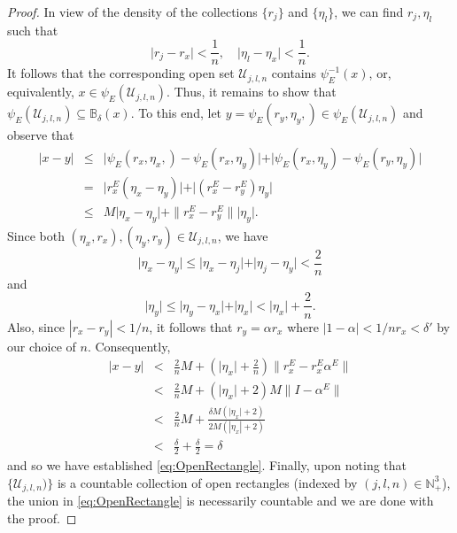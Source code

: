 \documentclass[11pt]{article}
\theoremstyle{remark}
\begin{document}
\begin{proof}
In view of the density of the collections $\{r_j\}$ and $\{\eta_l\}$, we can find $r_j, \eta_l$ such that
\begin{equation*}
    \vert r_j - r_x \vert < \frac{1}{n},\quad \vert \eta_l - \eta_x \vert < \frac{1}{n}.
\end{equation*}
It follows that the corresponding open set $\mathcal{U}_{j,l,n}$ contains $\psi_E^{-1}(x)$, or, equivalently, $x\in \psi_E(\mathcal{U}_{j,l,n})$. Thus, it remains to show that $\psi_E(\mathcal{U}_{j,l,n}) \subseteq \mathbb{B}_\delta(x)$. To this end, let $y=\psi_E(r_y,\eta_y,)\in\psi_E(\mathcal{U}_{j,l,n})$ and observe that
\begin{eqnarray*}
| x - y | &\leq& \vert \psi_E(r_x,\eta_x,) - \psi_E(r_x,\eta_y) \vert 
    + \vert \psi_E(r_x,\eta_y) - \psi_E(r_y,\eta_y) \vert\\
    &=&  \vert r_x^E (\eta_x - \eta_y) \vert + \vert (r_x^E - r_y^E) \eta_y \vert\\
    &\leq& M\vert \eta_x - \eta_y \vert + \|{r_x^E - r_y^E}\|  \vert \eta_y \vert.
\end{eqnarray*}
Since both $(\eta_x,r_x),(\eta_y,r_y) \in \mathcal{U}_{j,l,n}$, we have
\begin{equation*}
    \vert \eta_x - \eta_y \vert \leq \vert \eta_x - \eta_j \vert + \vert \eta_j - \eta_y \vert < \frac{2}{n}
\end{equation*}
and
\begin{equation*}
    \vert \eta_y \vert \leq \vert \eta_y - \eta_x \vert + \vert \eta_x \vert < \vert \eta_x \vert + \frac{2}{n}.
\end{equation*}
Also, since $|r_x-r_y|<1/n$, it follows that $r_y=\alpha r_x$ where $|1-\alpha|<1/nr_x < \delta'$ by our choice of $n$. Consequently,
\begin{eqnarray*}
    \vert x - y \vert 
    &< & \frac{2}{n} M+ \left( \vert \eta_x \vert + \frac{2}{n} \right) \|{r_x^E -  r_x^E \alpha^E}\|   \\ 
    &<& \frac{2}{n}M + \left( \vert \eta_x \vert + 2 \right)M\| I - \alpha^E\| \\
    &<&  \frac{2}{n}M +  \frac{\delta M \left( \vert \eta_x \vert + 2\right) }{2M (| \eta_x | + 2)}  \\
    &<& \frac{\delta}{2} + \frac{\delta}{2}=\delta 
\end{eqnarray*}
and so we have established \eqref{eq:OpenRectangle}. Finally, upon noting that $\{\mathcal{U}_{j,l,n})\}$ is a countable collection of open rectangles (indexed by $(j,l,n)\in\mathbb{N}_+^3$), the union in \eqref{eq:OpenRectangle} is necessarily countable and we are done with the proof.
\end{proof}
\end{document}
